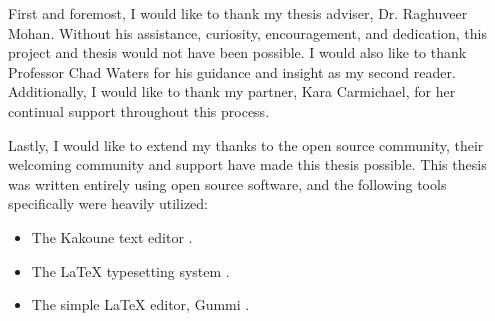 \begin{acknowledgement}

First and foremost, I would like to thank my thesis adviser, Dr. Raghuveer Mohan.
Without his assistance, curiosity, encouragement, and dedication, this
project and thesis would not have been possible. 
I would also like to thank Professor Chad Waters for his guidance and insight as my second reader.
Additionally, I would like to thank my partner, Kara Carmichael, for her continual support
throughout this process.

Lastly, I would like to extend my thanks to the open source community, their welcoming community and support have made this thesis possible.
This thesis was written entirely using open source software, and the following tools specifically were heavily utilized:
\begin{itemize}
\item The Kakoune text editor \cite{kakoune}.
\item The \LaTeX{} typesetting system \cite{latex}.
\item The simple \LaTeX{} editor, Gummi \cite{gummi}.
\end{itemize}

\end{acknowledgement}
